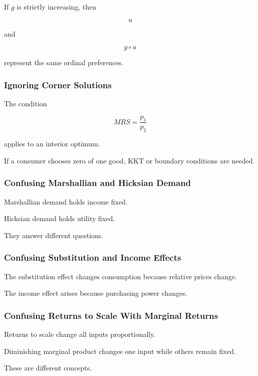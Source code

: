 If \(g\) is strictly increasing, then

\[
\boxed{
u
}
\]

and

\[
\boxed{
g\circ u
}
\]

represent the same ordinal preferences.

\subsubsection{Ignoring Corner Solutions}

The condition

\[
MRS
=
\frac{p_1}{p_2}
\]

applies to an interior optimum.

If a consumer chooses zero of one good, KKT or boundary conditions are
needed.

\subsubsection{Confusing Marshallian and Hicksian Demand}

Marshallian demand holds income fixed.

Hicksian demand holds utility fixed.

They answer different questions.

\subsubsection{Confusing Substitution and Income Effects}

The substitution effect changes consumption because relative prices change.

The income effect arises because purchasing power changes.

\subsubsection{Confusing Returns to Scale With Marginal Returns}

Returns to scale change all inputs proportionally.

Diminishing marginal product changes one input while others remain fixed.

These are different concepts.

